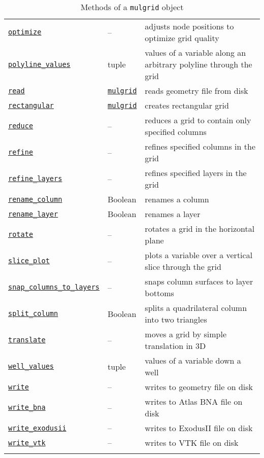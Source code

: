 \begin{center}
\begin{longtable}{|l|l|p{70mm}|}
  \hyperref[sec:mulgrid:optimize]{\texttt{optimize}} & -- & adjusts node positions to optimize grid quality\\
  \hyperref[sec:mulgrid:polyline_values]{\texttt{polyline\_values}} & tuple & values of a variable along an arbitrary polyline through the grid\\
  \hyperref[sec:mulgrid:read]{\texttt{read}} & \hyperref[mulgrids]{\texttt{mulgrid}} & reads geometry file from disk\\
  \hyperref[sec:mulgrid:rectangular]{\texttt{rectangular}} & \hyperref[mulgrids]{\texttt{mulgrid}} & creates rectangular grid\\
  \hyperref[sec:mulgrid:reduce]{\texttt{reduce}} & -- & reduces a grid to contain only specified columns\\
  \hyperref[sec:mulgrid:refine]{\texttt{refine}} & -- & refines specified columns in the grid\\
  \hyperref[sec:mulgrid:refine_layers]{\texttt{refine\_layers}} & -- & refines specified layers in the grid\\
  \hyperref[sec:mulgrid:rename_column]{\texttt{rename\_column}} & Boolean & renames a column\\
  \hyperref[sec:mulgrid:rename_layer]{\texttt{rename\_layer}} & Boolean & renames a layer\\
  \hyperref[sec:mulgrid:rotate]{\texttt{rotate}} & -- & rotates a grid in the horizontal plane\\
  \hyperref[sec:mulgrid:slice_plot]{\texttt{slice\_plot}} & -- & plots a variable over a vertical slice through the grid\\
  \hyperref[sec:mulgrid:snap_columns_to_layers]{\texttt{snap\_columns\_to\_layers}} & -- & snaps column surfaces to layer bottoms\\
  \hyperref[sec:mulgrid:split_column]{\texttt{split\_column}} & Boolean & splits a quadrilateral column into two triangles\\ 
  \hyperref[sec:mulgrid:translate]{\texttt{translate}} & -- & moves a grid by simple translation in 3D\\
  \hyperref[sec:mulgrid:well_values]{\texttt{well\_values}} & tuple & values of a variable down a well\\
  \hyperref[sec:mulgrid:write]{\texttt{write}} & -- & writes to geometry file on disk\\
  \hyperref[sec:mulgrid:write_bna]{\texttt{write\_bna}} & -- & writes to Atlas BNA file on disk\\ 
  \hyperref[sec:mulgrid:write_exodusii]{\texttt{write\_exodusii}} &  -- & writes to ExodusII file on disk\\
  \hyperref[sec:mulgrid:write_vtk]{\texttt{write\_vtk}} &  -- & writes to VTK file on disk\\
  \hline
  \caption{Methods of a \texttt{mulgrid} object}
  \label{tb:mulgrid_methods}
\end{longtable}
\end{center}

